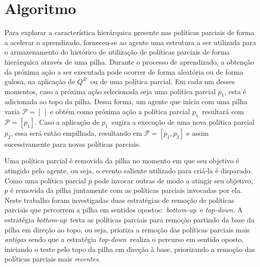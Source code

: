 \documentclass[kdmile,a4paper]{kdmile} %
\begin{document}
\section{Algoritmo}\label{sec:algoritmo}

\newcommand{\pilhaS}{\mathcal{P}}
\newcommand{\pilha}{$\pilhaS$}
\newcommand{\attS}{a_{t+1}}
\newcommand{\att}{$\attS$}
\newcommand{\qbS}{Q^B}
\newcommand{\qb}{$\qbS$}
\newcommand{\peumS}{p_1}
\newcommand{\peum}{$\peumS$}


Para explorar a característica hierárquica presente nas políticas
parciais de forma a acelerar o aprendizado, forneceu-se ao agente uma
estrutura a ser utilizada para o armazenamento do histórico de
utilização de políticas parciais de forma hierárquica através de uma
pilha.  Durante o processo de aprendizado, a obtenção da próxima ação
a ser executada pode ocorrer de forma aleatória ou de forma gulosa, na
aplicação de \qb\ ou de uma política parcial.  Em cada um desses
momentos, caso a próxima ação selecionada seja uma política parcial
$p_1$, esta é adicionada ao topo da pilha.  Dessa forma, um agente que
inicia com uma pilha vazia $\pilhaS=[\ ]$ e obtém como próxima ação a
política parcial \peum\ resultará com $\pilhaS=[\peumS]$. Caso a
aplicação de \peum\ sugira a execução de uma nova política parcial
$p_2$, essa será então empilhada, resultando em $\pilhaS=[\peumS,
p_2]$ e assim sucessivamente para novas políticas parciais.

\newcommand{\td}{\emph{top-down}}
\newcommand{\bu}{\emph{bottom-up}}

Uma política parcial é removida da pilha no momento em que seu
objetivo é atingido pelo agente, ou seja, o evento saliente utilizado
para criá-la é disparado.  Como uma política parcial $p$ pode invocar
outras de modo a atingir seu objetivo, $p$ é removida da pilha
juntamente com as políticas parciais invocadas por ela.  Neste
trabalho foram investigadas duas estratégias de remoção de políticas
parciais que percorrem a pilha em sentidos opostos:\ \bu\ e \td.  A
estratégia \bu\ testa as políticas parciais para remoção partindo da
base da pilha em direção ao topo, ou seja, prioriza a remoção das
políticas parciais mais \emph{antigas} sendo que a estratégia \td\
realiza o percurso em sentido oposto, iniciando o teste pelo topo da
pilha em direção à base, priorizando a remoção das políticas parciais
mais \emph{recentes}.

\end{document}
